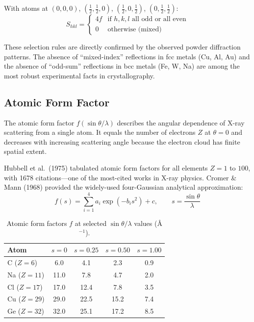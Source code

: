 With atoms at $(0,0,0)$, $(\tfrac{1}{2},\tfrac{1}{2},0)$, $(\tfrac{1}{2},0,\tfrac{1}{2})$, $(0,\tfrac{1}{2},\tfrac{1}{2})$:
\begin{equation}
  S_{hkl} =
  \begin{cases}
    4f & \text{if } h,k,l \text{ all odd or all even} \\
    0  & \text{otherwise (mixed)}
  \end{cases}
\end{equation}

These selection rules are directly confirmed by the observed powder diffraction patterns. The absence of ``mixed-index'' reflections in fcc metals (Cu, Al, Au) and the absence of ``odd-sum'' reflections in bcc metals (Fe, W, Na) are among the most robust experimental facts in crystallography.

\subsection{Atomic Form Factor}

The atomic form factor $f(\sin\theta/\lambda)$ describes the angular dependence of X-ray scattering from a single atom. It equals the number of electrons $Z$ at $\theta = 0$ and decreases with increasing scattering angle because the electron cloud has finite spatial extent.

Hubbell et al.\ (1975) tabulated atomic form factors for all elements $Z = 1$ to $100$, with 1678 citations---one of the most-cited works in X-ray physics. Cromer \& Mann (1968) provided the widely-used four-Gaussian analytical approximation:
\begin{equation}
  f(s) = \sum_{i=1}^{4} a_i \exp(-b_i s^2) + c, \qquad s = \frac{\sin\theta}{\lambda}
\end{equation}

\begin{table}[H]
\centering
\caption{Atomic form factors $f$ at selected $\sin\theta/\lambda$ values (\AA{}$^{-1}$).}
\label{tab:formfactor}
\begin{tabular}{@{}lSSSS@{}}
\toprule
Atom & {$s = 0$} & {$s = 0.25$} & {$s = 0.50$} & {$s = 1.00$} \\
\midrule
C ($Z=6$)   &  6.0 &  4.1 &  2.3 &  0.9 \\
Na ($Z=11$) & 11.0 &  7.8 &  4.7 &  2.0 \\
Cl ($Z=17$) & 17.0 & 12.4 &  7.8 &  3.5 \\
Cu ($Z=29$) & 29.0 & 22.5 & 15.2 &  7.4 \\
Ge ($Z=32$) & 32.0 & 25.1 & 17.2 &  8.5 \\
\bottomrule
\end{tabular}
\end{table}


